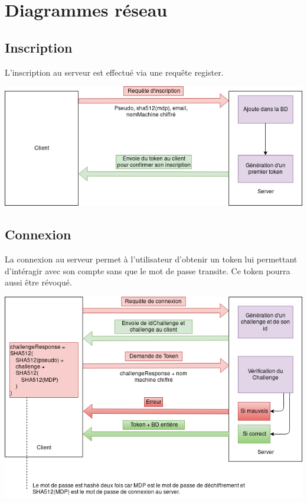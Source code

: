 \documentclass[oneside]{report}
\begin{document}
	\chapter{Diagrammes réseau}
	\vspace{2cm}
	\section{Inscription}{
		\par L'inscription au serveur est effectué via une requête register.\\
		\vspace{.5cm}
		\begin{center}
			\includegraphics[scale=.5]{reseau_register}
		\end{center}
	}

	\section{Connexion}{
		\par La connexion au serveur permet à l'utilisateur d'obtenir un token lui permettant d'intéragir avec son compte sans que le mot de passe transite. Ce token pourra aussi être révoqué.\\
		\vspace{.5cm}
		\begin{center}
			\includegraphics[scale=.5]{reseau_connexion}
		\end{center}
	}
\end{document}
